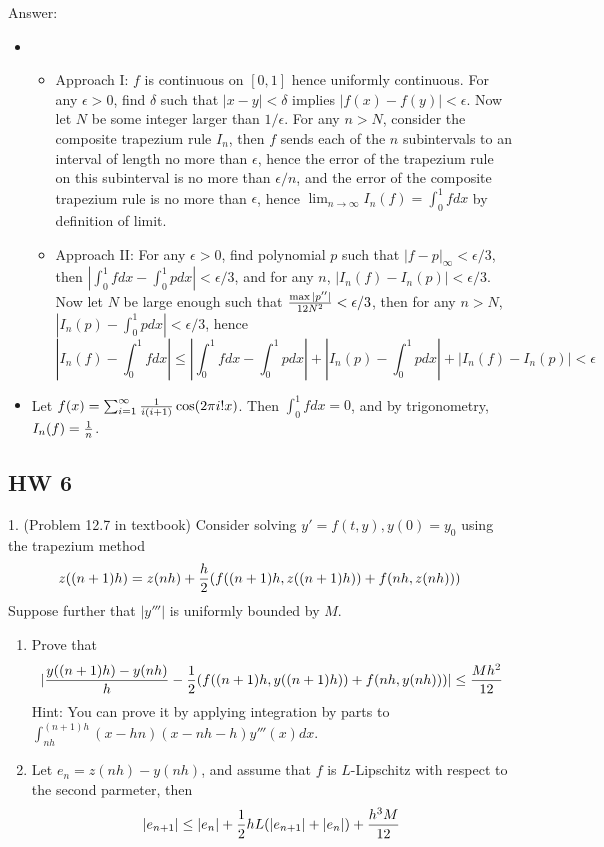 \documentclass[20pt]{article} %
\theoremstyle{break}
\begin{document}
Answer:
\begin{itemize}
\item \begin{itemize}
    \item Approach I: $f$ is continuous on $[0, 1]$ hence uniformly continuous. For any $\epsilon>0$, find $\delta$ such that $|x-y|<\delta$ implies $|f(x)-f(y)|<\epsilon$. Now let $N$ be some integer larger than $1/\epsilon$. For any $n>N$, consider the composite trapezium rule $I_n$, then $f$ sends each of the $n$ subintervals to an interval of length no more than $\epsilon$, hence the error of the trapezium rule on this subinterval is no more than $\epsilon/n$, and the error of the composite trapezium rule is no more than $\epsilon$, hence $\lim_{n\rightarrow\infty}I_n(f)=\int_0^1fdx$ by definition of limit.
    \item Approach II: For any $\epsilon>0$, find polynomial $p$ such that $|f-p|_\infty<\epsilon/3$, then $|\int_0^1fdx-\int_0^1pdx|<\epsilon/3$, and for any $n$, $|I_n(f)-I_n(p)|<\epsilon/3$. Now let $N$ be large enough such that ${\max|p''|\over 12N^2}<\epsilon/3$, then for any $n>N$, $|I_n(p)-\int_0^1pdx|<\epsilon/3$, hence
      \[|I_n(f)-\int_0^1fdx|\leq |\int_0^1fdx-\int_0^1pdx|+|I_n(p)-\int_0^1pdx|+|I_n(f)-I_n(p)|<\epsilon\]
   \end{itemize}
 \item Let $f(x)=\sum_{i=1}^\infty{1\over i(i+1)}\cos(2\pi i!x)$. Then $\int_0^1fdx=0$, and by trigonometry, $I_n(f)={1\over n}$. 
 \end{itemize}

 \subsection{HW 6}

 
1. (Problem 12.7 in textbook) Consider solving $y'=f(t, y), y(0)=y_0$ using the trapezium method
\[z((n+1)h)=z(nh)+{h\over 2}(f((n+1)h, z((n+1)h))+f(nh, z(nh)))\]
Suppose further that $|y'''|$ is uniformly bounded by $M$.
\begin{enumerate}
\item Prove that
  \[|{y((n+1)h)-y(nh)\over h}-{1\over 2}(f((n+1)h, y((n+1)h))+f(nh, y(nh)))|\leq {Mh^2\over 12}\]
  Hint: You can prove it by applying integration by parts to $\int_{nh}^{(n+1)h}(x-hn)(x-nh-h)y'''(x)dx$. 
\item Let $e_n=z(nh)-y(nh)$, and assume that $f$ is $L$-Lipschitz with respect to the second parmeter, then
  \[|e_{n+1}|\leq |e_n|+{1\over 2}hL(|e_{n+1}|+|e_n|)+{h^3M\over 12}\]
\end{enumerate}
\end{document}
